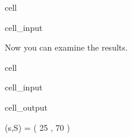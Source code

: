 \documentclass[letterpaper,10pt,english]{jupyterBook}
\begin{document}
\begin{sphinxuseclass}{cell}
\begin{sphinxVerbatimInput}
\begin{sphinxuseclass}{cell_input}
\end{sphinxuseclass}\end{sphinxVerbatimInput}

\end{sphinxuseclass}
\sphinxAtStartPar
Now you can examine the results.

\begin{sphinxuseclass}{cell}\begin{sphinxVerbatimInput}

\begin{sphinxuseclass}{cell_input}
\begin{sphinxVerbatim}[commandchars=\\\{\}]
\end{sphinxVerbatim}

\end{sphinxuseclass}\end{sphinxVerbatimInput}
\begin{sphinxVerbatimOutput}

\begin{sphinxuseclass}{cell_output}
\begin{sphinxVerbatim}[commandchars=\\\{\}]
(s,S) = ( 25 , 70 )
\end{sphinxVerbatim}


\end{sphinxuseclass}
\end{sphinxVerbatimOutput}
\end{sphinxuseclass}
\end{document}
